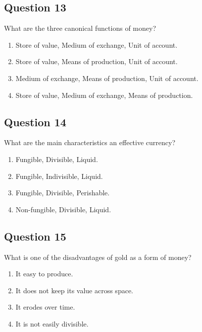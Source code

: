 \documentclass[12pt,a4paper]{article}
\begin{document}
\bigskip


\subsection*{Question 13}
What are the three canonical functions of money?

\begin{enumerate}[label=\Alph*., leftmargin=*]
\item Store of value, Medium of exchange, Unit of account.
\item Store of value, Means of production, Unit of account.
\item Medium of exchange, Means of production, Unit of account.
\item Store of value, Medium of exchange, Means of production.
\end{enumerate}

\bigskip


\subsection*{Question 14}
What are the main characteristics an effective currency?

\begin{enumerate}[label=\Alph*., leftmargin=*]
\item Fungible, Divisible, Liquid.
\item Fungible, Indivisible, Liquid.
\item Fungible, Divisible, Perishable.
\item Non-fungible, Divisible, Liquid.
\end{enumerate}

\bigskip


\subsection*{Question 15}
What is one of the disadvantages of gold as a form of money?

\begin{enumerate}[label=\Alph*., leftmargin=*]
\item It easy to produce.
\item It does not keep its value across space.
\item It erodes over time.
\item It is not easily divisible.
\end{enumerate}

\bigskip
\end{document}
